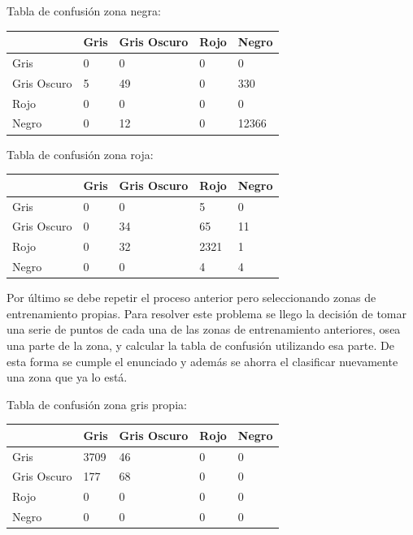 \documentclass[a4paper,10pt]{article}
\begin{document}
Tabla de confusión zona negra:\newline

\begin{tabular}{ | l | l | l | l | l |  }
		& Gris &   Gris Oscuro     & Rojo    & Negro\\ \hline
Gris          & 0   &        0  &   0&      0\\ \hline
Gris Oscuro          & 5  &        49   &  0&    330\\ \hline
Rojo & 0  &  0  &  0 & 0\\ \hline
Negro          & 0 &         12  & 0 &   12366\\ \hline

\end{tabular}\newline

Tabla de confusión zona roja:\newline

\begin{tabular}{| l | l | l | l | l |  }
		& Gris &   Gris Oscuro     & Rojo    & Negro\\ \hline
Gris          & 0    &       0   &        5     &      0\\ \hline
Gris Oscuro          & 0   &       34    &      65    &      11\\ \hline
Rojo          & 0  &        32     &   2321   &        1\\ \hline
Negro          & 0 &          0      &     4  &         4\\ \hline
\end{tabular}\newline
           
Por \'ultimo se debe repetir el proceso anterior pero seleccionando zonas de entrenamiento propias. Para resolver este problema se llego la decisi\'on de tomar una serie de puntos de cada una de las zonas de entrenamiento anteriores, osea una parte de la zona, y calcular la tabla de confusi\'on utilizando esa parte. De esta forma se cumple el enunciado y adem\'as se ahorra el clasificar nuevamente una zona que ya lo est\'a. \newline


Tabla de confusión zona gris propia:\newline
\begin{tabular}{ | l | l | l | l | l |  }
		& Gris &   Gris Oscuro     & Rojo    & Negro\\ \hline
  Gris &             3709  &        46 & 0 & 0\\ \hline
    Gris Oscuro &       177        &  68 & 0 & 0\\ \hline

  Rojo  &   0 & 0 & 0 & 0\\ \hline
  Negro & 0 & 0 & 0 & 0\\ \hline
\end{tabular}\newline
\end{document}

